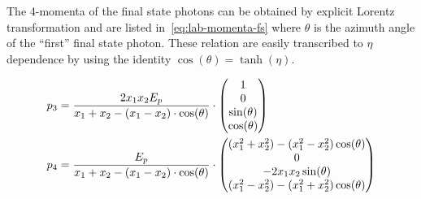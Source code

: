 \begin{wrapfigure}{R}{0.4\textwidth}
\centering
{}
\end{wrapfigure}
The 4-momenta of the final state photons can be obtained by explicit
Lorentz transformation and are listed in~\eqref{eq:lab-momenta-fs}
where \(\theta\) is the azimuth angle of the ``first'' final state
photon.  These relation are easily transcribed to \(\eta\) dependence
by using the identity \(\cos(\theta) = \tanh(\eta)\).


\begin{align}
  \label{eq:lab-momenta-fs}
  p_3 &= \frac{2x_1x_2E_p}{x_1+x_2 - (x_1 - x_2)\cdot\cos(\theta)}\cdot
  \mqty(1 \\ 0 \\ \sin(\theta) \\ \cos(\theta)) \\
  p_4 &= \frac{E_p}{x_1+x_2 - (x_1 - x_2)\cdot\cos(\theta)}\cdot
  \mqty((x_1^2+x_2^2) - (x_1^2-x_2^2)\cos(\theta) \\ 0 \\ -2x_1x_2\sin(\theta) \\ (x_1^2-x_2^2) - (x_1^2+x_2^2)\cos(\theta))
\end{align}
